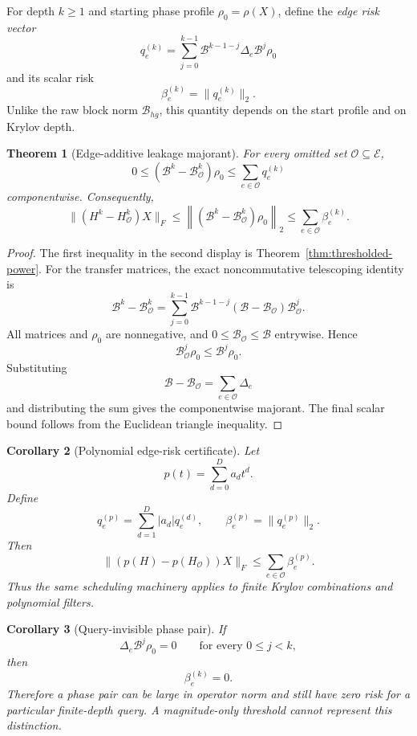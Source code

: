 \documentclass[11pt]{article}
\newtheorem{theorem}{Theorem}[section]
\newtheorem{corollary}[theorem]{Corollary}
\theoremstyle{definition}
\theoremstyle{remark}
\begin{document}
For depth $k\ge1$ and starting phase profile $\rho_0=\rho(X)$, define the
\emph{edge risk vector}
\[
\boxed{
q_e^{(k)}
=
\sum_{j=0}^{k-1}
\mathcal B^{k-1-j}\Delta_e\mathcal B^j\rho_0
}
\]
and its scalar risk
\[
\boxed{
\beta_e^{(k)}=\lVert q_e^{(k)}\rVert_2.
}
\]
Unlike the raw block norm $\mathcal B_{hg}$, this quantity depends on the
start profile and on Krylov depth.

\begin{theorem}[Edge-additive leakage majorant]
\label{thm:edge-additive-majorant}
For every omitted set $\mathcal O\subseteq\mathcal E$,
\[
\boxed{
0\le
(\mathcal B^k-\mathcal B_{\mathcal O}^k)\rho_0
\le
\sum_{e\in\mathcal O}q_e^{(k)}
}
\]
componentwise.  Consequently,
\[
\boxed{
\lVert(H^k-H_{\mathcal O}^k)X\rVert_F
\le
\left\lVert
(\mathcal B^k-\mathcal B_{\mathcal O}^k)\rho_0
\right\rVert_2
\le
\sum_{e\in\mathcal O}\beta_e^{(k)}.
}
\]
\end{theorem}

\begin{proof}
The first inequality in the second display is
Theorem~\ref{thm:thresholded-power}.  For the transfer matrices, the exact
noncommutative telescoping identity is
\[
\mathcal B^k-\mathcal B_{\mathcal O}^k
=
\sum_{j=0}^{k-1}
\mathcal B^{k-1-j}
(\mathcal B-\mathcal B_{\mathcal O})
\mathcal B_{\mathcal O}^j.
\]
All matrices and $\rho_0$ are nonnegative, and
$0\le\mathcal B_{\mathcal O}\le\mathcal B$ entrywise.  Hence
\[
\mathcal B_{\mathcal O}^j\rho_0
\le
\mathcal B^j\rho_0.
\]
Substituting
\[
\mathcal B-\mathcal B_{\mathcal O}
=
\sum_{e\in\mathcal O}\Delta_e
\]
and distributing the sum gives the componentwise majorant.  The final scalar
bound follows from the Euclidean triangle inequality.
\end{proof}

\begin{corollary}[Polynomial edge-risk certificate]
Let
\[
p(t)=\sum_{d=0}^{D}a_dt^d.
\]
Define
\[
q_e^{(p)}
=
\sum_{d=1}^{D}|a_d|q_e^{(d)},
\qquad
\beta_e^{(p)}=\lVert q_e^{(p)}\rVert_2.
\]
Then
\[
\boxed{
\lVert(p(H)-p(H_{\mathcal O}))X\rVert_F
\le
\sum_{e\in\mathcal O}\beta_e^{(p)}.
}
\]
Thus the same scheduling machinery applies to finite Krylov combinations and
polynomial filters.
\end{corollary}

\begin{corollary}[Query-invisible phase pair]
If
\[
\Delta_e\mathcal B^j\rho_0=0
\qquad
\text{for every }0\le j<k,
\]
then
\[
\beta_e^{(k)}=0.
\]
Therefore a phase pair can be large in operator norm and still have zero
risk for a particular finite-depth query.  A magnitude-only threshold cannot
represent this distinction.
\end{corollary}
\end{document}
